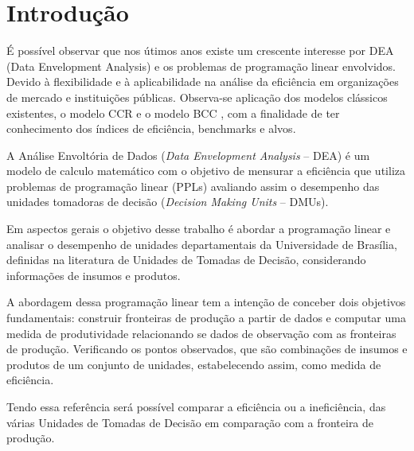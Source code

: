 \chapter*[Introdução]{Introdução}

É possível observar que nos útimos anos existe um crescente interesse por DEA (Data Envelopment Analysis) e os problemas de programação linear envolvidos. Devido à flexibilidade e à aplicabilidade na análise da eficiência em organizações de mercado e instituições públicas. Observa-se aplicação dos modelos clássicos existentes, o modelo CCR  e o modelo BCC , com a finalidade de ter conhecimento dos índices de eficiência, benchmarks e alvos. 

A Análise Envoltória de Dados (\textit{Data Envelopment Analysis} – DEA) é um modelo de calculo matemático com o objetivo de mensurar a eficiência que utiliza problemas de programação linear (PPLs) avaliando assim o desempenho das unidades tomadoras de decisão (\textit{Decision Making Units} – DMUs).


Em aspectos gerais o objetivo desse trabalho é abordar a programação linear e analisar o desempenho de unidades departamentais da Universidade de Brasília, definidas na literatura de Unidades de Tomadas de Decisão, considerando informações de insumos e produtos.

A abordagem dessa programação linear tem a intenção de conceber dois objetivos fundamentais: construir
fronteiras de produção a partir de dados e computar uma medida de produtividade relacionando se dados de observação com as fronteiras de produção. Verificando os pontos observados, que são combinações de insumos e produtos de um conjunto de unidades, estabelecendo assim, como medida de eficiência. 

Tendo essa referência será possível comparar a eficiência ou a ineficiência, das várias Unidades de Tomadas de Decisão em comparação com a fronteira de produção.








